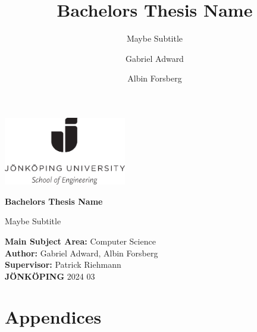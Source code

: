 \documentclass[11pt]{scrreprt}
\title{Bachelors Thesis Name}
\subtitle{Maybe Subtitle}
\author{Gabriel Adward \and Albin Forsberg}
\begin{document}
\begin{titlepage}
        \includegraphics[width=0.4\textwidth]{./Images/ju.png}
        \vspace{2cm}
        
        \fontsize{40}{40}\selectfont
        \textbf{Bachelors Thesis Name}
        
        \vspace{0.5cm}
        \LARGE
        Maybe Subtitle
        
        \vfill
        \small
        \noindent
        \textbf{Main Subject Area:} Computer Science \\
        \textbf{Author:} Gabriel Adward, Albin Forsberg \\
        \textbf{Supervisor:} Patrick Riehmann \\
        \textbf{JÖNKÖPING} 2024 03
\end{titlepage}




\begin{abstract}
    
\end{abstract}

\tableofcontents








\cite{DECAS}



\chapter{Appendices}
\appendix

\end{document}
